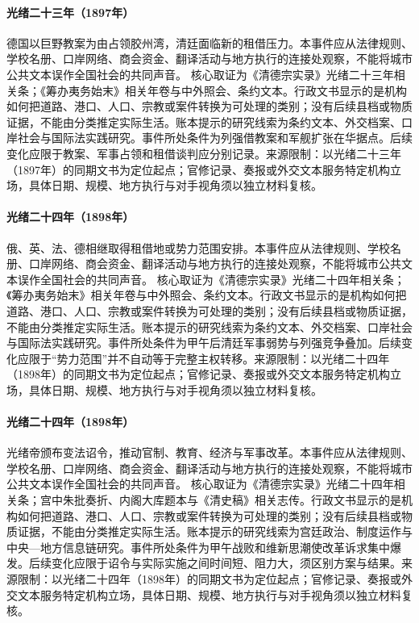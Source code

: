 \hypertarget{civic:EQ-1897-JIAOZHOU-BAY-OCCUPATION}{}\paragraph{光绪二十三年（1897年）}德国以巨野教案为由占领胶州湾，清廷面临新的租借压力。本事件应从法律规则、学校名册、口岸网络、商会资金、翻译活动与地方执行的连接处观察，不能将城市公共文本误作全国社会的共同声音。 核心取证为《清德宗实录》光绪二十三年相关条；《筹办夷务始末》相关年卷与中外照会、条约文本。行政文书显示的是机构如何把道路、港口、人口、宗教或案件转换为可处理的类别；没有后续县档或物质证据，不能由分类推定实际生活。账本提示的研究线索为条约文本、外交档案、口岸社会与国际法实践研究。事件所处条件为列强借教案和军舰扩张在华据点。后续变化应限于教案、军事占领和租借谈判应分别记录。来源限制：以光绪二十三年（1897年）的同期文书为定位起点；官修记录、奏报或外交文本服务特定机构立场，具体日期、规模、地方执行与对手视角须以独立材料复核。
\hypertarget{civic:EQ-1898-LEASED-TERRITORIES}{}\paragraph{光绪二十四年（1898年）}俄、英、法、德相继取得租借地或势力范围安排。本事件应从法律规则、学校名册、口岸网络、商会资金、翻译活动与地方执行的连接处观察，不能将城市公共文本误作全国社会的共同声音。 核心取证为《清德宗实录》光绪二十四年相关条；《筹办夷务始末》相关年卷与中外照会、条约文本。行政文书显示的是机构如何把道路、港口、人口、宗教或案件转换为可处理的类别；没有后续县档或物质证据，不能由分类推定实际生活。账本提示的研究线索为条约文本、外交档案、口岸社会与国际法实践研究。事件所处条件为甲午后清廷军事弱势与列强竞争叠加。后续变化应限于“势力范围”并不自动等于完整主权转移。来源限制：以光绪二十四年（1898年）的同期文书为定位起点；官修记录、奏报或外交文本服务特定机构立场，具体日期、规模、地方执行与对手视角须以独立材料复核。
\hypertarget{civic:EQ-1898-HUNDRED-DAYS-REFORM}{}\paragraph{光绪二十四年（1898年）}光绪帝颁布变法诏令，推动官制、教育、经济与军事改革。本事件应从法律规则、学校名册、口岸网络、商会资金、翻译活动与地方执行的连接处观察，不能将城市公共文本误作全国社会的共同声音。 核心取证为《清德宗实录》光绪二十四年相关条；宫中朱批奏折、内阁大库题本与《清史稿》相关志传。行政文书显示的是机构如何把道路、港口、人口、宗教或案件转换为可处理的类别；没有后续县档或物质证据，不能由分类推定实际生活。账本提示的研究线索为宫廷政治、制度运作与中央—地方信息链研究。事件所处条件为甲午战败和维新思潮使改革诉求集中爆发。后续变化应限于诏令与实际实施之间时间短、阻力大，须区别方案与结果。来源限制：以光绪二十四年（1898年）的同期文书为定位起点；官修记录、奏报或外交文本服务特定机构立场，具体日期、规模、地方执行与对手视角须以独立材料复核。
